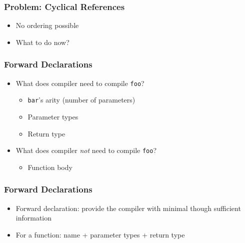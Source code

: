 \documentclass{../ucll-slides}
\begin{document}
\begin{frame}
  \frametitle{Problem: Cyclical References}
  \begin{overprint}
  \end{overprint}
  \begin{itemize}
    \item No ordering possible
    \item What to do now?
  \end{itemize}
\end{frame}

\begin{frame}
  \frametitle{Forward Declarations}
  \begin{itemize}
    \item What does compiler need to compile {\tt foo}?
          \begin{itemize}
            \item<2-> {\tt bar}'s arity (number of parameters)
            \item<3-> Parameter types
            \item<4-> Return type
          \end{itemize}
    \item<5-> What does compiler \emph{not} need to compile {\tt foo}?
          \begin{itemize}
            \item Function body
          \end{itemize}
  \end{itemize}
\end{frame}

\begin{frame}
  \frametitle{Forward Declarations}
  \begin{overprint}
  \end{overprint}
  \begin{itemize}
    \item Forward declaration: provide the compiler with minimal though sufficient information
    \item For a function: name + parameter types + return type
  \end{itemize}
\end{frame}
\end{document}
